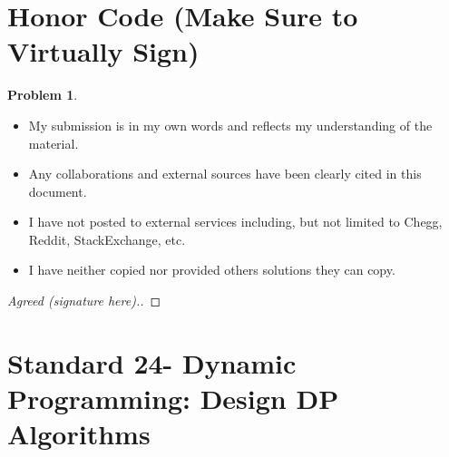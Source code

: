 \documentclass[11pt]{article}
\theoremstyle{definition}
\theoremstyle{definition}
\newtheorem{required}{Problem}
\theoremstyle{definition}
\begin{document}
\section{Honor Code (Make Sure to Virtually Sign)} \label{HonorCode}

\begin{required}
\begin{itemize}
\item My submission is in my own words and reflects my understanding of the material.
\item Any collaborations and external sources have been clearly cited in this document.
\item I have not posted to external services including, but not limited to Chegg, Reddit, StackExchange, etc.
\item I have neither copied nor provided others solutions they can copy.
\end{itemize}

\end{required}

\begin{proof}[Agreed (signature here).]
\end{proof}


\newpage
\section{Standard 24- Dynamic Programming: Design DP Algorithms}
\end{document}
